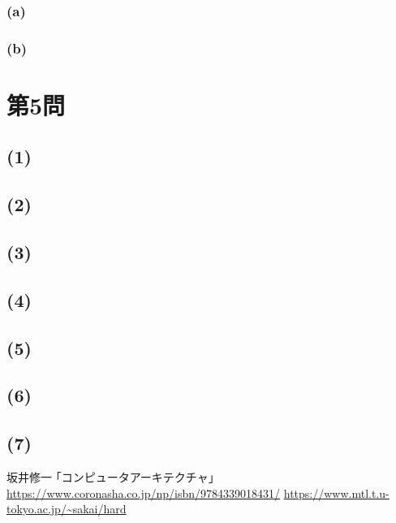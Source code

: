 \documentclass[a4paper,12pt,xelatex,ja=standard]{bxjsarticle}
\begin{document}
    \subsubsection*{(a)}
    \subsubsection*{(b)}

\section*{第5問\ }
  \subsection*{(1)}
  \subsection*{(2)}
  \subsection*{(3)}
  \subsection*{(4)}
  \subsection*{(5)}
  \subsection*{(6)}
  \subsection*{(7)}

\begin{thebibliography}{99}
   坂井修一 ｢コンピュータアーキテクチャ｣ \\
    \url{https://www.coronasha.co.jp/np/isbn/9784339018431/}
   \url{https://www.mtl.t.u-tokyo.ac.jp/~sakai/hard}
\end{thebibliography}
\end{document}

